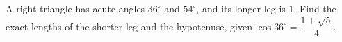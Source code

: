 A right triangle has acute angles $36^\circ$ and $54^\circ$, and its longer leg is $1$. Find the exact lengths of the shorter leg and the hypotenuse, given $\cos36^\circ=\dfrac{1+\sqrt5}4$.
